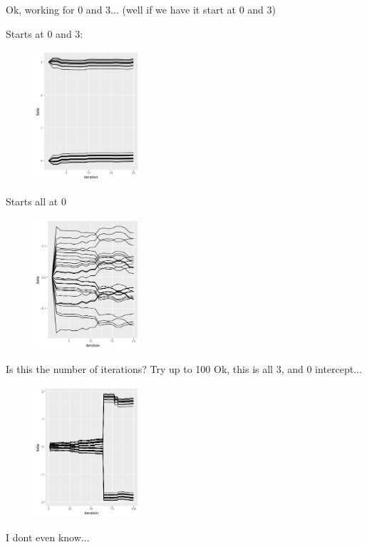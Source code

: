\documentclass[10pt]{article}
\theoremstyle{definition}
\begin{document}
Ok, working for 0 and 3... (well if we have it start at 0 and 3)



Starts at 0 and 3:
\begin{figure}[!htb]
	\centering
	\includegraphics[width=0.35\textwidth]{img/Temp_week_journal-51eb1ed3.png}
	\caption{}
	\label{}
\end{figure}

Starts all at 0
\begin{figure}[!htb]
	\centering
	\includegraphics[width=0.35\textwidth]{img/Temp_week_journal-33c02f24.png}
	\caption{}
	\label{}
\end{figure}

Is this the number of iterations?
Try up to 100
Ok, this is all 3, and 0 intercept...
\begin{figure}[!htb]
	\centering
	\includegraphics[width=0.35\textwidth]{img/Temp_week_journal-b735531a.png}
	\caption{}
	\label{}
\end{figure}
I dont even know...
\end{document}
